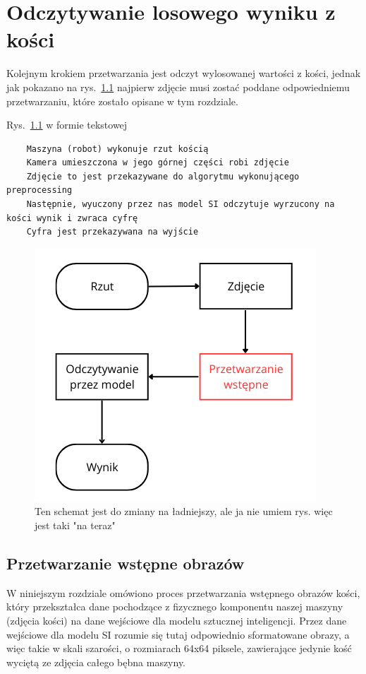 \chapter{Odczytywanie losowego wyniku z kości}\label{ch:odczytywanie-losowego-wyniku-z-kosci}

Kolejnym krokiem przetwarzania jest odczyt wylosowanej wartości z kości,
jednak jak pokazano na rys.~\ref{fig:schemat_workflow}
najpierw zdjęcie musi zostać poddane odpowiedniemu przetwarzaniu, które zostało opisane w tym rozdziale.

Rys.~\ref{fig:schemat_workflow} w formie tekstowej
\begin{verbatim}
    Maszyna (robot) wykonuje rzut kością
    Kamera umieszczona w jego górnej części robi zdjęcie
    Zdjęcie to jest przekazywane do algorytmu wykonującego preprocessing
    Następnie, wyuczony przez nas model SI odczytuje wyrzucony na kości wynik i zwraca cyfrę
    Cyfra jest przekazywana na wyjście
\end{verbatim}

\begin{figure}[H]
    \centering
    \includegraphics[width=0.5\linewidth]{chapters/04-czytanie/figures/schemat}
    \caption{Ten schemat jest do zmiany na ładniejszy, ale ja nie umiem rys. więc jest taki "na teraz"}
    \label{fig:schemat_workflow}
\end{figure}

\section{Przetwarzanie wstępne obrazów}\label{sec:preprocessing}

W niniejszym rozdziale omówiono proces przetwarzania wstępnego obrazów kości,
który przekształca dane pochodzące z fizycznego komponentu naszej maszyny (zdjęcia kości) na dane wejściowe dla modelu sztucznej inteligencji.
Przez dane wejściowe dla modelu SI rozumie się tutaj odpowiednio sformatowane obrazy, a więc takie w skali szarości,
o rozmiarach 64x64 piksele, zawierające jedynie kość wyciętą ze zdjęcia całego bębna maszyny.

